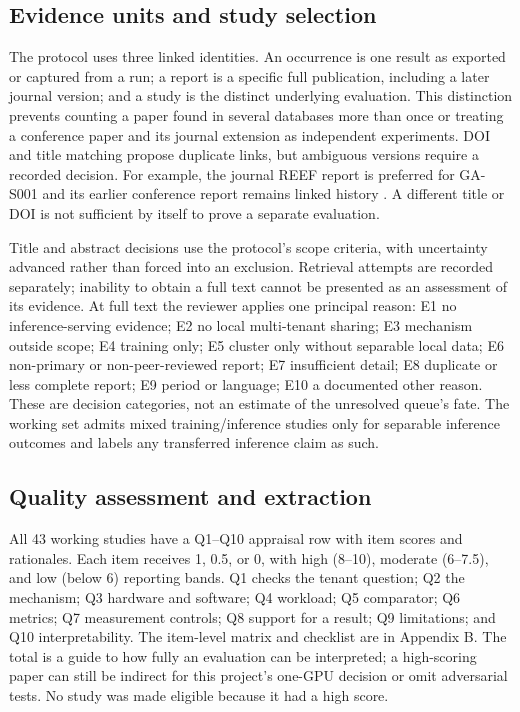 \subsection{Evidence units and study selection}
The protocol uses three linked identities. An occurrence is one result as exported or captured from a run; a report is a specific full publication, including a later journal version; and a study is the distinct underlying evaluation. This distinction prevents counting a paper found in several databases more than once or treating a conference paper and its journal extension as independent experiments. DOI and title matching propose duplicate links, but ambiguous versions require a recorded decision. For example, the journal REEF report is preferred for GA-S001 and its earlier conference report remains linked history \cite{reef}. A different title or DOI is not sufficient by itself to prove a separate evaluation.

Title and abstract decisions use the protocol's scope criteria, with uncertainty advanced rather than forced into an exclusion. Retrieval attempts are recorded separately; inability to obtain a full text cannot be presented as an assessment of its evidence. At full text the reviewer applies one principal reason: E1 no inference-serving evidence; E2 no local multi-tenant sharing; E3 mechanism outside scope; E4 training only; E5 cluster only without separable local data; E6 non-primary or non-peer-reviewed report; E7 insufficient detail; E8 duplicate or less complete report; E9 period or language; E10 a documented other reason. These are decision categories, not an estimate of the unresolved queue's fate. The working set admits mixed training/inference studies only for separable inference outcomes and labels any transferred inference claim as such.

\subsection{Quality assessment and extraction}
All 43 working studies have a Q1--Q10 appraisal row with item scores and rationales. Each item receives 1, 0.5, or 0, with high (8--10), moderate (6--7.5), and low (below 6) reporting bands. Q1 checks the tenant question; Q2 the mechanism; Q3 hardware and software; Q4 workload; Q5 comparator; Q6 metrics; Q7 measurement controls; Q8 support for a result; Q9 limitations; and Q10 interpretability. The item-level matrix and checklist are in Appendix B. The total is a guide to how fully an evaluation can be interpreted; a high-scoring paper can still be indirect for this project's one-GPU decision or omit adversarial tests. No study was made eligible because it had a high score.

